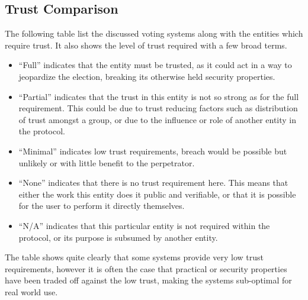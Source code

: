 \subsection{Trust Comparison}

The following table list the discussed voting systems along with the entities which require trust. It also shows the level of trust required with a few broad terms.

\begin{itemize}
    \item ``Full'' indicates that the entity must be trusted, as it could act in a way to jeopardize the election, breaking its otherwise held security properties.
    \item ``Partial'' indicates that the trust in this entity is not so strong as for the full requirement. This could be due to trust reducing factors such as distribution of trust amongst a group, or due to the influence or role of another entity in the protocol.
    \item ``Minimal'' indicates low trust requirements, breach would be possible but unlikely or with little benefit to the perpetrator.
    \item ``None'' indicates that there is no trust requirement here. This means that either the work this entity does it public and verifiable, or that it is possible for the user to perform it directly themselves.
    \item ``N/A'' indicates that this particular entity is not required within the protocol, or its purpose is subsumed by another entity.
\end{itemize}

The table shows quite clearly that some systems provide very low trust requirements, however it is often the case that practical or security properties have been traded off against the low trust, making the systems sub-optimal for real world use.

